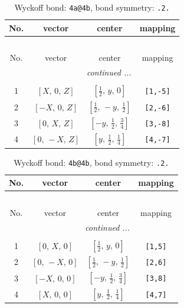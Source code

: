 \documentclass[fleqn,8pt]{jsarticle}
\begin{document}
\begin{longtable}{cccc}
\caption{Wyckoff bond: {\tt 4a@4b}, bond symmetry: {\tt .2.}}
 \\
 \hline \hline
No. & vector & center & mapping \\ \hline \endfirsthead

\multicolumn{3}{l}{\tablename\ \thetable{}} \\
 \hline \hline
No. & vector & center & mapping \\ \hline \endhead

 \hline \hline
\multicolumn{3}{r}{\footnotesize\it continued ...} \\ \endfoot

 \hline \hline
\multicolumn{3}{r}{} \\ \endlastfoot

1 & $\left[ X,\, 0,\, Z \right]$ & $\left[ \frac{1}{2},\, y,\, 0 \right]$ & {\tt [1,-5]} \\ \hline
2 & $\left[ - X,\, 0,\, Z \right]$ & $\left[ \frac{1}{2},\, - y,\, \frac{1}{2} \right]$ & {\tt [2,-6]} \\ \hline
3 & $\left[ 0,\, X,\, Z \right]$ & $\left[ - y,\, \frac{1}{2},\, \frac{3}{4} \right]$ & {\tt [3,-8]} \\ \hline
4 & $\left[ 0,\, - X,\, Z \right]$ & $\left[ y,\, \frac{1}{2},\, \frac{1}{4} \right]$ & {\tt [4,-7]} \\
\end{longtable}
\renewcommand{\arraystretch}{1.2}
\begin{longtable}{cccc}
\caption{Wyckoff bond: {\tt 4b@4b}, bond symmetry: {\tt .2.}}
 \\
 \hline \hline
No. & vector & center & mapping \\ \hline \endfirsthead

\multicolumn{3}{l}{\tablename\ \thetable{}} \\
 \hline \hline
No. & vector & center & mapping \\ \hline \endhead

 \hline \hline
\multicolumn{3}{r}{\footnotesize\it continued ...} \\ \endfoot

 \hline \hline
\multicolumn{3}{r}{} \\ \endlastfoot

1 & $\left[ 0,\, X,\, 0 \right]$ & $\left[ \frac{1}{2},\, y,\, 0 \right]$ & {\tt [1,5]} \\ \hline
2 & $\left[ 0,\, - X,\, 0 \right]$ & $\left[ \frac{1}{2},\, - y,\, \frac{1}{2} \right]$ & {\tt [2,6]} \\ \hline
3 & $\left[ - X,\, 0,\, 0 \right]$ & $\left[ - y,\, \frac{1}{2},\, \frac{3}{4} \right]$ & {\tt [3,8]} \\ \hline
4 & $\left[ X,\, 0,\, 0 \right]$ & $\left[ y,\, \frac{1}{2},\, \frac{1}{4} \right]$ & {\tt [4,7]} \\
\end{longtable}
\end{document}
